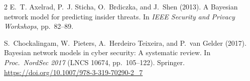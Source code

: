 \documentclass[11pt,a4paper]{article}
\begin{document}
\begin{thebibliography}{2}
E.~T. Axelrad, P.~J. Sticha, O.~Brdiczka, and J.~Shen (2013).
A Bayesian network model for predicting insider threats.
In \emph{IEEE Security and Privacy Workshops}, pp.\ 82--89.

S.~Chockalingam, W.~Pieters, A.~Herdeiro Teixeira, and P.~van Gelder (2017).
Bayesian network models in cyber security: A systematic review.
In \emph{Proc.\ NordSec 2017} (LNCS 10674, pp.\ 105--122).
Springer. \url{https://doi.org/10.1007/978-3-319-70290-2_7}
\end{thebibliography}
\end{document}
